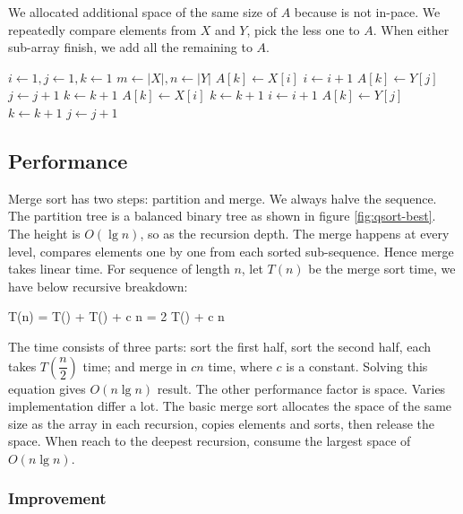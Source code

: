 \documentclass[b5paper]{article}
\begin{document}
We allocated additional space of the same size of $A$ because  is not in-pace. We repeatedly compare elements from $X$ and $Y$, pick the less one to $A$. When either sub-array finish, we add all the remaining to $A$.

\begin{algorithmic}[1]
  \State $i \gets 1, j\gets 1, k\gets 1$
  \State $m \gets |X|, n \gets |Y|$
      \State $A[k] \gets X[i]$
      \State $i \gets i + 1$
    \Else
      \State $A[k] \gets Y[j]$
      \State $j \gets j + 1$
    \EndIf
    \State $k \gets k + 1$
  \EndWhile
    \State $A[k] \gets X[i]$
    \State $k \gets k + 1$
    \State $i \gets i + 1$
  \EndWhile
    \State $A[k] \gets Y[j]$
    \State $k \gets k + 1$
    \State $j \gets j + 1$
  \EndWhile
\EndProcedure
\end{algorithmic}

\subsection{Performance}

Merge sort has two steps: partition and merge. We always halve the sequence. The partition tree is a balanced binary tree as shown in figure \ref{fig:qsort-best}. The height is $O(\lg n)$, so as the recursion depth. The merge happens at every level, compares elements one by one from each sorted sub-sequence. Hence merge takes linear time. For sequence of length $n$, let $T(n)$ be the merge sort time, we have below recursive breakdown:

\be
T(n) = T() + T() + c n = 2 T() + c n
\ee

The time consists of three parts: sort the first half, sort the second half, each takes $T(\dfrac{n}{2})$ time; and merge in $c n$ time, where $c$ is a constant. Solving this equation gives $O(n \lg n)$ result. The other performance factor is space. Varies implementation differ a lot. The basic merge sort allocates the space of the same size as the array in each recursion, copies elements and sorts, then release the space. When reach to the deepest recursion, consume the largest space of $O(n \lg n)$.

\subsubsection{Improvement}
\end{document}

